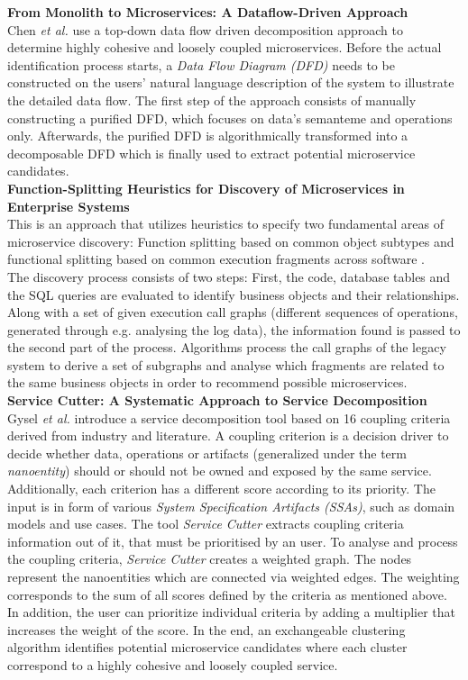 \noindent
\textbf{From Monolith to Microservices: A Dataflow-Driven Approach } \\
Chen \textit{et al.} \cite{DataflowDrivenChen} use a top-down data flow driven decomposition approach to determine highly cohesive and loosely coupled microservices. Before the actual identification process starts, a \textit{Data Flow Diagram (DFD)} needs to be constructed on the users' natural language description of the system to illustrate the detailed data flow. The first step of the approach consists of manually constructing a purified DFD, which focuses on data's semanteme and operations only. Afterwards, the purified DFD is algorithmically transformed into a decomposable DFD which is finally used to extract potential microservice candidates. \\


\noindent
\textbf{Function-Splitting Heuristics for Discovery of Microservices in Enterprise Systems  } \\
This is an approach that utilizes heuristics to specify two fundamental areas of microservice discovery: Function splitting based on common object subtypes and functional splitting based on common execution fragments across software \cite{HeuristicsAlwis}. \\
The discovery process consists of two steps: First, the code, database tables and the SQL queries are evaluated to identify business objects and their relationships. Along with a set of given execution call graphs (different sequences of operations, generated through e.g. analysing the log data), the information found is passed to the second part of the process. Algorithms process the call graphs of the legacy system to derive a set of subgraphs and analyse which fragments are related to the same business objects in order to recommend possible microservices. \\

\noindent
\textbf{Service Cutter: A Systematic Approach to Service Decomposition  } \\
Gysel \textit{et al.} \cite{ServiceCutter} introduce a service decomposition tool based on 16 coupling criteria derived from industry and literature. A coupling criterion is a decision driver to decide whether data, operations or artifacts (generalized under the term \textit{nanoentity}) should or should not be owned and exposed by the same service. Additionally, each criterion has a different score according to its priority.
The input is in form of various \textit{System Specification Artifacts (SSAs)}, such as domain models and use cases.  The tool \textit{Service Cutter} extracts coupling criteria information out of it, that must be prioritised by an user. To analyse and process the coupling criteria, \textit{Service Cutter} creates a weighted graph. The nodes represent the nanoentities which are connected via weighted edges. The weighting corresponds to the sum of all scores defined by the criteria as mentioned above. In addition, the user can prioritize individual criteria by adding a multiplier that increases the weight of the score. In the end, an exchangeable clustering algorithm identifies potential microservice candidates where each cluster correspond to a highly cohesive and loosely coupled service.
 
